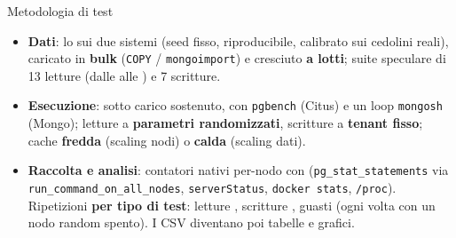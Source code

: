 \documentclass[aspectratio=169,11pt]{beamer}
\begin{document}
\begin{frame}{Metodologia di test}
  \small
  \begin{itemize}\setlength\itemsep{5pt}
    \item \textbf{Dati}: lo  sui due sistemi (seed fisso, riproducibile,
          calibrato sui cedolini reali), caricato in \textbf{bulk} (\texttt{COPY} / \texttt{mongoimport}) e
          cresciuto \textbf{a lotti}; suite speculare di 13 letture (dalle  alle
          ) e 7 scritture.
    \item \textbf{Esecuzione}:  sotto carico sostenuto, con \texttt{pgbench} (Citus)
          e un loop \texttt{mongosh} (Mongo); letture a \textbf{parametri randomizzati}, scritture a
          \textbf{tenant fisso}; cache \textbf{fredda} (scaling nodi) o \textbf{calda} (scaling dati).
    \item \textbf{Raccolta e analisi}: contatori nativi per-nodo con 
          (\texttt{pg\_stat\_statements} via \texttt{run\_command\_on\_all\_nodes}, \texttt{serverStatus},
          \texttt{docker stats}, \texttt{/proc}). Ripetizioni \textbf{per tipo di test}: letture , scritture , guasti  (ogni volta con un nodo random spento). I CSV diventano poi tabelle e grafici.
  \end{itemize}
\end{frame}
\end{document}
